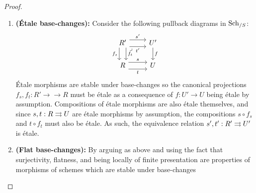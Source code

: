                 \begin{proof}
                    \noindent
                    \begin{enumerate}
                        \item \textbf{(\'Etale base-changes):} Consider the following pullback diagrams in $\mathrm{Sch}_{/S}$:
                            $$
                                \begin{tikzcd}
                                	{R'} & {U'} \\
                                	R & U
                                	\arrow["{t'}"', shift right=2, from=1-1, to=1-2]
                                	\arrow["t"', shift right=2, from=2-1, to=2-2]
                                	\arrow["{f_s}"', shift right=2, from=1-1, to=2-1]
                                	\arrow["f", from=1-2, to=2-2]
                                	\arrow["\lrcorner"{anchor=center, pos=0.125}, draw=none, from=1-1, to=2-2]
                                	\arrow["s", shift left=2, from=2-1, to=2-2]
                                	\arrow["{s'}", shift left=2, from=1-1, to=1-2]
                                	\arrow["{f_t}", shift left=2, from=1-1, to=2-1]
                                \end{tikzcd}
                            $$
                        \'Etale morphisms are stable under base-changes so the canonical projections $f_s, f_t: R' \to\to R$ must be \'etale as a consequence of $f: U' \to U$ being \'etale by assumption. Compositions of \'etale morphisms are also \'etale themselves, and since $s, t: R \rightrightarrows U$ are \'etale morphisms by assumption, the compositions $s \circ f_s$ and $t \circ f_t$ must also be \'etale. As such, the equivalence relation $s', t': R' \rightrightarrows U'$ is \'etale. 
                        \item \textbf{(Flat base-changes):} By arguing as above and using the fact that surjectivity, flatness, and being locally of finite presentation are properties of morphisms of schemes which are stable under base-changes
                    \end{enumerate}
                \end{proof}
